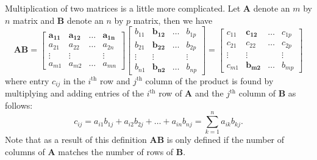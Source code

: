 Multiplication of two matrices is a little more complicated. Let $\mathbf{A}$ denote an $m$ by $n$ matrix and $\mathbf{B}$ denote an $n$ by $p$ matrix, then we have
\[ \mathbf{AB} = \left[ \begin{array}{cccc} \mathbf{a_{11}} & \mathbf{a_{12}} & \ldots & \mathbf{a_{1n}} \\
a_{21} & a_{22} & \ldots & a_{2n} \\
\vdots & \vdots & & \vdots \\
a_{m1} & a_{m2} & \ldots & a_{mn} \end{array} \right]
\left[ \begin{array}{cccc} 
b_{11} & \mathbf{b_{12}} & \ldots & b_{1p} \\
b_{21} & \mathbf{b_{22}} & \ldots & b_{2p} \\
\vdots & \vdots & & \vdots \\
b_{n1} & \mathbf{b_{n2}} & \ldots & b_{np} \end{array} \right] =
\left[ \begin{array}{cccc} 
c_{11} & \mathbf{c_{12}} & \ldots & c_{1p} \\
c_{21} & c_{22} & \ldots & c_{2p} \\
\vdots & \vdots & & \vdots \\
c_{m1} & \mathbf{b_{m2}} & \ldots & b_{mp} \end{array} \right] \]
where entry $c_{ij}$ in the $i^{\mbox{th}}$ row and $j^{\mbox{th}}$ column of the product is found by
multiplying and adding entries of the $i^{\mbox{th}}$ row of $\mathbf{A}$ and the $j^{\mbox{th}}$ column
of $\mathbf{B}$ as follows:
\[ c_{ij} = a_{i1}b_{1j} + a_{i2}b_{2j} + \ldots + a_{in}b_{nj} = \sum_{k = 1}^n a_{ik}b_{kj}.\]
Note that as a result of this definition $\mathbf{AB}$ is only defined if the number of columns of $\mathbf{A}$ matches
the number of rows of $\mathbf{B}$.

